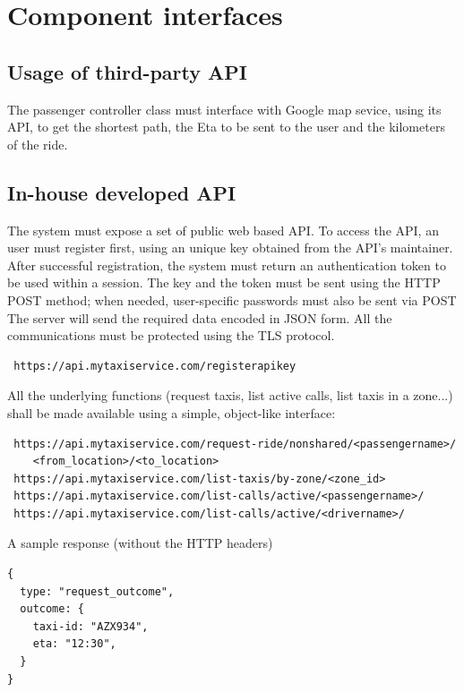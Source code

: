 \section{Component interfaces}

\subsection{Usage of third-party API}
The passenger controller class must interface with Google map sevice, using its API, to get the shortest path, the Eta to be sent to the user and the 
kilometers of the ride.

\subsection{In-house developed API}
The system must expose a set of public web based API. To access the API, an user must register first, using an unique key
obtained from the API's maintainer.
After successful registration, the system must return an authentication token to be used within a session.
The key and the token must be sent using the HTTP POST method; when needed, user-specific passwords must also
be sent via POST
The server will send the required data encoded in JSON form.
All the communications must be protected using the TLS protocol.
\begin{verbatim}
 https://api.mytaxiservice.com/registerapikey
\end{verbatim}
All the underlying functions (request taxis, list active calls, list taxis in a zone...) shall be made available using a simple,
object-like interface:
\begin{verbatim}
 https://api.mytaxiservice.com/request-ride/nonshared/<passengername>/
    <from_location>/<to_location>
 https://api.mytaxiservice.com/list-taxis/by-zone/<zone_id>
 https://api.mytaxiservice.com/list-calls/active/<passengername>/
 https://api.mytaxiservice.com/list-calls/active/<drivername>/
\end{verbatim}
A sample response (without the HTTP headers)
\begin{verbatim}
{
  type: "request_outcome",
  outcome: {
    taxi-id: "AZX934",
    eta: "12:30",
  }
}
\end{verbatim}


